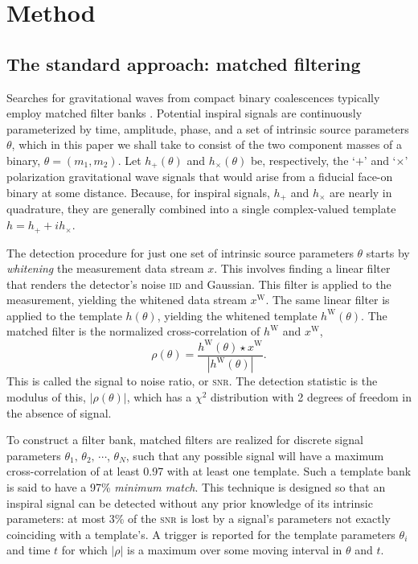 \section{Method}
\label{SECII}\label{sec:method}
\subsection{The standard approach: matched filtering}

Searches for gravitational waves from compact binary coalescences typically employ matched filter banks \cite{findchirppaper}.  Potential inspiral signals are continuously parameterized by time, amplitude, phase, and a set of intrinsic source parameters $\theta$, which in this paper we shall take to consist of the two component masses of a binary, $\theta = (m_1, m_2)$.  Let $h_+(\theta)$ and $h_\times(\theta)$ be, respectively, the `$+$' and `$\times$' polarization gravitational wave signals that would arise from a fiducial face-on binary at some distance.  Because, for inspiral signals, $h_+$ and $h_\times$ are nearly in quadrature, they are generally combined into a single complex-valued template $h = h_+ + i h_\times$.

The detection procedure for just one set of intrinsic source parameters $\theta$ starts by {\em whitening} the measurement data stream $x$.  This involves finding a linear filter that renders the detector's noise \textsc{iid} and Gaussian.  This filter is applied to the measurement, yielding the whitened data stream $x^\mathrm W$.  The same linear filter is applied to the template $h(\theta)$, yielding the whitened template $h^\mathrm W (\theta)$.  The matched filter is the normalized cross-correlation of $h^\mathrm W$ and $x^\mathrm W$, 
$$
\rho(\theta) = \frac{h^\mathrm W (\theta) \star x^\mathrm W}{|h^\mathrm W (\theta)|}.
$$
This is called the signal to noise ratio, or \textsc{snr}.  The detection statistic is the modulus of this, $|\rho(\theta)|$, which has a $\chi^2$ distribution with 2 degrees of freedom in the absence of signal.%

To construct a filter bank, matched filters are realized for discrete signal parameters $\theta_1,\, \theta_2,\, \cdots$, $\theta_N$, such that any possible signal will have a maximum cross-correlation of at least 0.97 with at least one template.    Such a template bank is said to have a 97\% {\em minimum match}.  This technique is designed so that an inspiral signal can be detected without any prior knowledge of its intrinsic parameters: at most 3\% of the \textsc{snr} is lost by a signal's parameters not exactly coinciding with a template's.  A trigger is reported for the template parameters $\theta_i$ and time $t$ for which $|\rho|$ is a maximum over some moving interval in $\theta$ and $t$.

